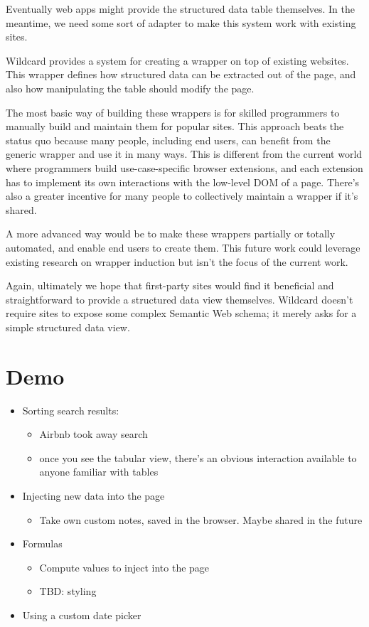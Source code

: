 \documentclass[english,submission]{programming}
\providecommand{\tightlist}{%
  \setlength{\itemsep}{0pt}\setlength{\parskip}{0pt}}
\begin{document}
Eventually web apps might provide the structured data table themselves.
In the meantime, we need some sort of adapter to make this system work
with existing sites.

Wildcard provides a system for creating a wrapper on top of existing
websites. This wrapper defines how structured data can be extracted out
of the page, and also how manipulating the table should modify the page.

The most basic way of building these wrappers is for skilled programmers
to manually build and maintain them for popular sites. This approach
beats the status quo because many people, including end users, can
benefit from the generic wrapper and use it in many ways. This is
different from the current world where programmers build
use-case-specific browser extensions, and each extension has to
implement its own interactions with the low-level DOM of a page. There's
also a greater incentive for many people to collectively maintain a
wrapper if it's shared.

A more advanced way would be to make these wrappers partially or totally
automated, and enable end users to create them. This future work could
leverage existing research on wrapper induction but isn't the focus of
the current work.

Again, ultimately we hope that first-party sites would find it
beneficial and straightforward to provide a structured data view
themselves. Wildcard doesn't require sites to expose some complex
Semantic Web schema; it merely asks for a simple structured data view.

\hypertarget{demo}{%
\section{Demo}\label{demo}}

\begin{itemize}
\tightlist
\item
  Sorting search results:

  \begin{itemize}
  \tightlist
  \item
    Airbnb took away search
  \item
    once you see the tabular view, there's an obvious interaction
    available to anyone familiar with tables
  \end{itemize}
\item
  Injecting new data into the page

  \begin{itemize}
  \tightlist
  \item
    Take own custom notes, saved in the browser. Maybe shared in the
    future
  \end{itemize}
\item
  Formulas

  \begin{itemize}
  \tightlist
  \item
    Compute values to inject into the page
  \item
    TBD: styling
  \end{itemize}
\item
  Using a custom date picker
\end{itemize}
\end{document}

